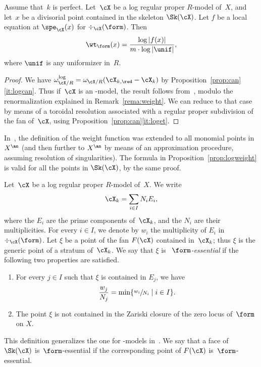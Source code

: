 \begin{prop}\label{prop:logweight} Assume that~$k$ is perfect.
Let~$\cX$ be a log regular proper $R$\nobreakdash-model of~$X$, and let~$x$ be a divisorial point contained in the skeleton $\Sk(\cX)$.
Let $f$ be a local equation at $\spe_{\cX}(x)$ for $\div_{\cX}(\form)$. Then
\[
\wt_{\form}(x)=\frac{\log |f(x)|}{m\cdot \log |\unif|},
\]
where $\unif$ is any uniformizer in~$R$.
\end{prop}
\begin{proof} We have $\omega^{\log}_{\cX/R}=\omega_{\cX/R}(\cX_{k,\red}-\cX_k)$ by Proposition~\ref{prop:can}\eqref{it:logcan}.
Thus if~$\cX$ is an \snc-model, the result follows from~\cite[4.3.7]{MuNi}, modulo the renormalization explained in Remark~\ref{rema:weight}.
We can reduce to that case by means of a toroidal resolution associated with a regular proper subdivision of the fan of~$\cX$, using Proposition~\ref{prop:can}\eqref{it:loget}.
\end{proof}

\begin{remark}
In~\cite{MuNi}, the definition of the weight function was extended to all monomial points in $X^{\an}$ (and then further to $X^{\an}$ by means of an approximation procedure, assuming resolution of singularities). The formula in Proposition~\ref{prop:logweight} is valid for all the points in $\Sk(\cX)$, by the same proof.
\end{remark}

Let~$\cX$ be a log regular proper $R$\nobreakdash-model of~$X$. We write
\[
\cX_k=\sum_{i\in I}N_iE_i,
\]
where the $E_i$ are the prime components of~$\cX_k$, and the $N_i$ are their multiplicities. For every $i\in I$, we denote by $w_i$ the multiplicity of $E_i$ in $\div_{\cX}(\form)$.
Let $\xi$ be a point of the fan $F(\cX)$ contained in~$\cX_k$; thus $\xi$ is the generic point of a stratum of~$\cX_k$.
We say that $\xi$ is {\em~$\form$-essential} if the following two properties are satisfied.
\begin{enumerate}
\item For every $j\in I$ such that $\xi$ is contained in $E_j$, we have
\[
\frac{w_j}{N_j}=\min\{\sfrac{w_i}{N_i}\mid i\in I\}.
\]
\item The point $\xi$ is not contained in the Zariski closure of the zero locus of~$\form$ on $X$.
\end{enumerate}
This definition generalizes the one for \snc-models in~\cite[4.7.4]{MuNi}. We say that a face of $\Sk(\cX)$ is~$\form$-essential if the corresponding point of $F(\cX)$ is~$\form$-essential.

